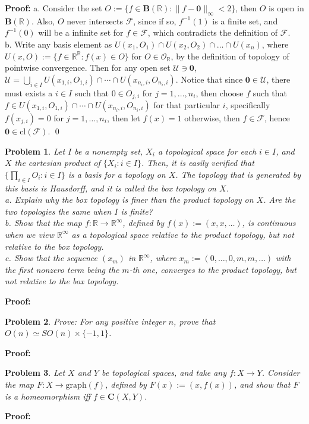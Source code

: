 \documentclass[12pt]{article}
\newtheorem{problem}{Problem}
\begin{document}
\textbf{Proof:} a. Consider the set $O:=\{f\in\textbf{B}(\mathbb{R}):\|f-\textbf{0}\|_{\infty}<2\}$, then $O$ is open in $\textbf{B}(\mathbb{R})$. Also, $O$ never intersects $\mathcal{F}$, since if so, $f^{-1}(1)$ is a finite set, and $f^{-1}(0)$ will be a infinite set for $f\in\mathcal{F}$, which contradicts the definition of $\mathcal{F}$. \\
\indent b. Write any basis element as $U(x_{1}, O_{1})\cap U(x_{2}, O_{2})\cap\dots\cap U(x_{n})$, where $U(x,O):= \{f\in\mathbb{R}^{\mathbb{R}}: f(x)\in O\}$ for $O\in\mathcal{O}_{\mathbb{R}}$, by the definition of topology of pointwise convergence. Then for any open set $\mathcal{U}\ni \textbf{0}$, $\mathcal{U}=\bigcup_{i\in I}U(x_{1,i}, O_{1, i})\cap\cdots\cap U(x_{n_{i}, i}, O_{n_{i}, i})$. Notice that since $\textbf{0}\in\mathcal{U}$, there must exists a $i\in I$ such that $0\in O_{j,i}$ for $j=1, \dots, n_{i}$, then choose $f$ such that $f\in U(x_{1,i}, O_{1, i})\cap\cdots\cap U(x_{n_{i}, i}, O_{n_{i}, i})$ for that particular $i$, specifically $f(x_{j, i})=0$ for $j=1, \dots, n_{i}$, then let $f(x)=1$ otherwise, then $f\in\mathcal{F}$, hence $\textbf{0}\in\text{cl}(\mathcal{F})$. \qed
\\
\begin{problem}
Let $I$ be a nonempty set, $X_{i}$ a topological space for each $i\in I$, and $X$ the cartesian product of $\{X_{i}: i\in I\}$. Then, it is easily verified that $\{\prod_{i\in I} O_{i}: i\in I\}$ is a basis for a topology on $X$. The topology that is generated by this basis is Hausdorff, and it is called the box topology on $X$. \\
\indent a. Explain why the box topology is finer than the product topology on $X$. Are the two topologies the same when $I$ is finite? \\
\indent b. Show that the map $f: \mathbb{R}\to\mathbb{R}^{\infty}$, defined by $f(x):= (x, x, \dots)$, is continuous when we view $\mathbb{R}^{\infty}$ as a topological space relative to the product topology, but not relative to the box topology. \\
\indent c. Show that the sequence $(x_{m})$ in $\mathbb{R}^{\infty}$, where $x_{m}:= (0, \dots, 0, m, m, \dots)$ with the first nonzero term being the $m$-th one, converges to the product topology, but not relative to the box topology.
\end{problem}

\textbf{Proof:} 
\\
\begin{problem}
Prove: For any positive integer $n$, prove that $O(n)\simeq SO(n)\times \{-1, 1\}$.
\end{problem}

\textbf{Proof:} 

\begin{problem}
Let $X$ and $Y$ be topological spaces, and take any $f: X\to Y$. Consider the map $F: X\to \text{graph}(f)$, defined by $F(x):= (x, f(x))$, and show that $F$ is a homeomorphism iff $f\in\textbf{C}(X,Y)$.
\end{problem}

\textbf{Proof:} 
\end{document}
